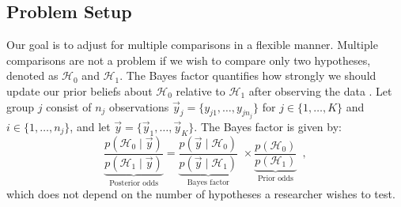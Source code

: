 \documentclass[11pt,a4paper]{article}
\theoremstyle{definition} %
\theoremstyle{case}
\begin{document}
\subsection{Problem Setup}
Our goal is to adjust for multiple comparisons in a flexible manner. Multiple comparisons are not a problem if we wish to compare only two hypotheses, denoted as $\mathcal{H}_0$ and $\mathcal{H}_1$. The Bayes factor quantifies how strongly we should update our prior beliefs about $\mathcal{H}_0$ relative to $\mathcal{H}_1$ after observing the data \parencite{kass1995bayes, ly2016harold}. Let group $j$ consist of $n_j$ observations $\vec{y}_j = \{y_{j1}, \ldots, y_{jn_j}\}$ for $j \in \{1, \ldots, K\}$ and $i \in \{1, \ldots, n_j\}$, and let $\vec{y} = \{\vec{y}_1, \ldots ,\vec{y}_K\}$. The Bayes factor is given by:
\begin{equation}
    \underbrace{\frac{p(\mathcal{H}_0 \mid \vec{y})}{p(\mathcal{H}_1 \mid \vec{y})}}_{\text{Posterior odds}} = \underbrace{\frac{p(\vec{y} \mid \mathcal{H}_0)}{p(\vec{y} \mid \mathcal{H}_1)}}_{\text{Bayes factor}} \, \, \times \underbrace{\frac{p(\mathcal{H}_0)}{p(\mathcal{H}_1)}}_{\text{Prior odds}} \enspace ,
\end{equation}
which does not depend on the number of hypotheses a researcher wishes to test.%
\end{document}
